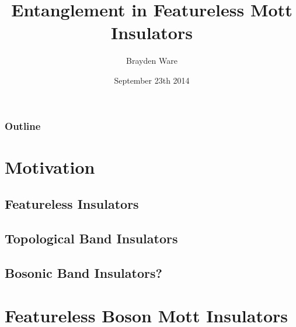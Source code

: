 \documentclass[t]{beamer}
\title{Entanglement in Featureless Mott Insulators}
\author{Brayden Ware}
\date{September 23th 2014}
\begin{document}
\frame{\titlepage}



% 

\section*{}

\begin{frame}
  \frametitle{Outline}
  \vskip-1.5cm
  \tableofcontents
\end{frame}



\section{Motivation}
\subsection{Featureless Insulators}



%
%
\subsection{Topological Band Insulators}

\subsection{Bosonic Band Insulators?}

\section{Featureless Boson Mott Insulators}

\end{document}
